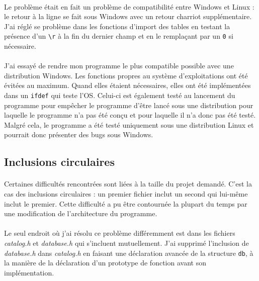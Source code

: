 \documentclass{article}
\begin{document}
    \paragraph{}
    Le problème était en fait un problème de compatibilité entre Windows et Linux : le retour à la ligne se fait sous Windows avec un retour charriot supplémentaire. J'ai réglé se problème dans les fonctions d'import des tables en testant la présence d'un \texttt{\textbackslash r} à la fin du dernier champ et en le remplaçant par un \texttt{0} si nécessaire.

    \paragraph{}
    J'ai essayé de rendre mon programme le plus compatible possible avec une distribution Windows. Les fonctions propres au système d'exploitations ont été évitées au maximum. Quand elles étaient nécessaires, elles ont été implémentées dans un \texttt{ifdef} qui teste l'OS. Celui-ci est également testé au lancement du programme pour empêcher le programme d'être lancé sous une distribution pour laquelle le programme n'a pas été conçu et pour laquelle il n'a donc pas été testé. Malgré cela, le programme a été testé uniquement sous une distribution Linux et pourrait donc présenter des bugs sous Windows.


    \subsection{Inclusions circulaires}
    \paragraph{}
    Certaines difficultés rencontrées sont liées à la taille du projet demandé. C'est la cas des inclusions circulaires : un premier fichier inclut un second qui lui-même inclut le premier. Cette difficulté a pu être contournée la plupart du temps par une modification de l'architecture du programme.
    
    \paragraph{}
    Le seul endroit où j'ai résolu ce problème différemment est dans les fichiers \emph{catalog.h} et \emph{database.h} qui s'incluent mutuellement. J'ai supprimé l'inclusion de \emph{database.h} dans \emph{catalog.h} en faisant une déclaration avancée de la structure \texttt{db}, à la manière de la déclaration d'un prototype de fonction avant son implémentation.
\end{document}
